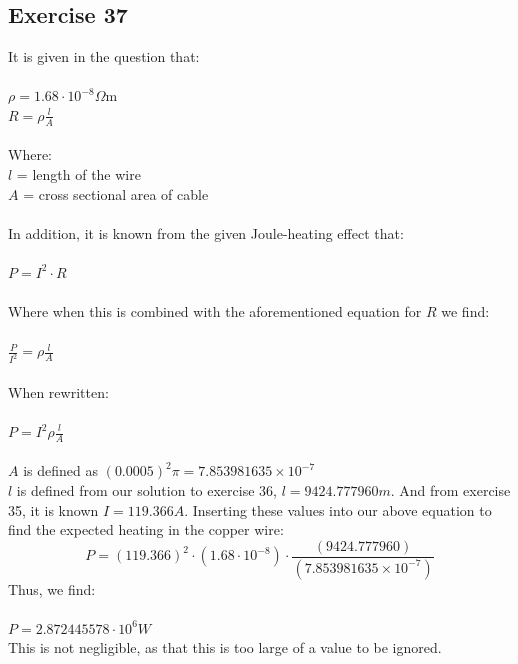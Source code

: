 \documentclass{article}
\begin{document}
\subsection{Exercise 37}
It is given in the question that:
\\
\\
$\rho= 1.68\cdot10^{-8}\Omega\mathrm{m}$
\\
$R=\rho\frac{l}{A}$
\\
\\
Where:
\\
$l$ = length of the wire
\\
$A$ = cross sectional area of cable
\\
\\
In addition, it is known from the given Joule-heating effect that:
\\
\\
$P = I^2 \cdot R$
\\
\\
Where when this is combined with the aforementioned equation for $R$ we find:
\\
\\
$\frac{P}{I^{2}}=\rho\frac{l}{A}$
\\
\\
When rewritten:
\\
\\
$P=I^{2}\rho\frac{l}{A}$
\\
\\
$A$ is defined as $\left( 0.0005\right)^{2}\pi= 7.853981635\times10^{-7}$
\\
$l$ is defined from our solution to exercise 36, $l = 9424.777960m$.
And from exercise 35, it is known $I= 119.366A$.
Inserting these values into our above equation to find the expected heating in the copper wire:
\begin{equation}
    P=\left( 119.366\right)^{2}\cdot\left( 1.68\cdot10^{-8}\right)\cdot\frac{\left( 9424.777960\right)}{\left( 7.853981635\times10^{-7}\right)}
\end{equation}
Thus, we find:
\\
\\
$P = 2.872445578 \cdot 10^6 W$
\\
This is not negligible, as that this is too large of a value to be ignored.
\end{document}
